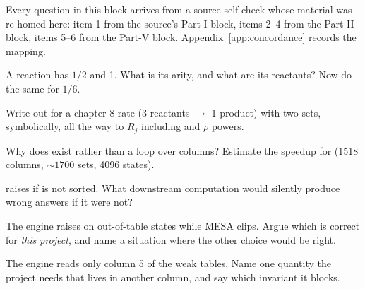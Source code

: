 \begin{aside}
Every question in this block arrives from a source self-check whose material was
re-homed here: item 1 from the source's Part-I block, items 2--4 from the
Part-II block, items 5--6 from the Part-V block.
Appendix~\ref{app:concordance} records the mapping.
\end{aside}

\begin{selfcheck}
\item A reaction has  $1/2$ and  1. What is its
      arity, and what are its reactants? Now do the same for 
      $1/6$.
\item Write out  for a chapter-8 rate (3 reactants $\to$ 1 product)
      with two sets, symbolically, all the way to $R_j$ including
       and $\rho$ powers.
\item Why does  exist rather than a loop over columns? Estimate
      the speedup for  (1518 columns, ${\sim}1700$ sets, 4096 states).
\item {} raises if  is not sorted. What
      downstream computation would silently produce wrong answers if it were
      not?
\item The engine raises on out-of-table states while MESA clips. Argue which is
      correct for \emph{this project}, and name a situation where the other
      choice would be right.
\item The engine reads only column 5 of the weak tables. Name one quantity the
      project needs that lives in another column, and say which invariant it
      blocks.
\end{selfcheck}
